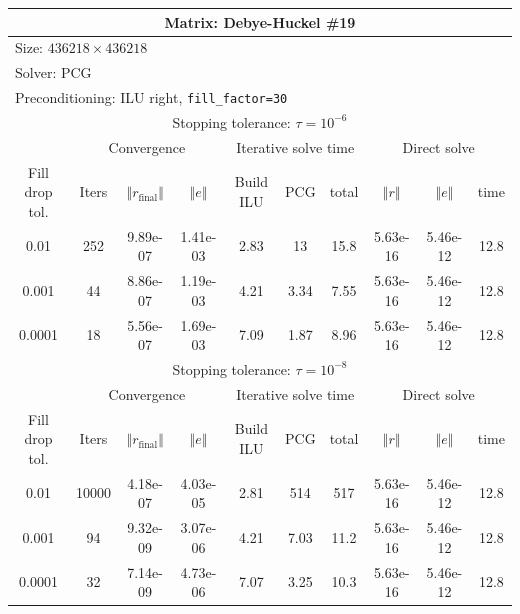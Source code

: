 \documentclass[oneside,final]{amsart}  %
\begin{document}
\begin{tabular}{|c|c|c|c|c|c|c|c|c|c|}
\hline
\multicolumn{10}{|c|}{Matrix: Debye-Huckel \#19}\tabularnewline
\hline
  \multicolumn{10}{|l|}{Size: $436218\times436218$}\tabularnewline
\hline
\multicolumn{10}{|l|}{Solver: PCG}\tabularnewline
\hline
\multicolumn{10}{|l|}{Preconditioning: ILU right, \texttt{fill\_factor=30}}\tabularnewline
\hline
\hline
\multicolumn{10}{|c|}{Stopping tolerance: $\tau=10^{-6}$}\tabularnewline
\hline
\hline
 & \multicolumn{3}{c|}{Convergence} & \multicolumn{3}{c|}{Iterative solve time} & \multicolumn{3}{c|}{Direct solve}\tabularnewline
\hline
Fill drop tol.  & Iters & $\left\Vert r_{\text{final}}\right\Vert $  & $\left\Vert e\right\Vert $  & Build ILU  & PCG  & total  & $\left\Vert r\right\Vert $ & $\left\Vert e\right\Vert $  & time\tabularnewline
\hline
  0.01 & 252 & 9.89e-07 & 1.41e-03 &       2.83 &         13 &       15.8 & 5.63e-16 & 5.46e-12 &       12.8\\
  \hline
  0.001 & 44 & 8.86e-07 & 1.19e-03 &       4.21 &       3.34 &       7.55 & 5.63e-16 & 5.46e-12 &       12.8\\
  \hline
  0.0001 & 18 & 5.56e-07 & 1.69e-03 &       7.09 &       1.87 &       8.96 & 5.63e-16 & 5.46e-12 &       12.8\\
  \hline
\hline
\multicolumn{10}{|c|}{Stopping tolerance: $\tau=10^{-8}$}\tabularnewline
\hline
\hline
 & \multicolumn{3}{c|}{Convergence} & \multicolumn{3}{c|}{Iterative solve time} & \multicolumn{3}{c|}{Direct solve }\tabularnewline
\hline
Fill drop tol.  & Iters  & $\left\Vert r_{\text{final}}\right\Vert $  & $\left\Vert e\right\Vert $ & Build ILU  & PCG  & total  & $\left\Vert r\right\Vert $  & $\left\Vert e\right\Vert $  & time\tabularnewline
\hline
  0.01 & 10000 & 4.18e-07 & 4.03e-05 &       2.81 &        514 &        517 & 5.63e-16 & 5.46e-12 &       12.8\\
  \hline
  0.001 & 94 & 9.32e-09 & 3.07e-06 &       4.21 &       7.03 &       11.2 & 5.63e-16 & 5.46e-12 &       12.8\\
  \hline
  0.0001 & 32 & 7.14e-09 & 4.73e-06 &       7.07 &       3.25 &       10.3 & 5.63e-16 & 5.46e-12 &       12.8\\
  \hline
\end{tabular}
\end{document}
